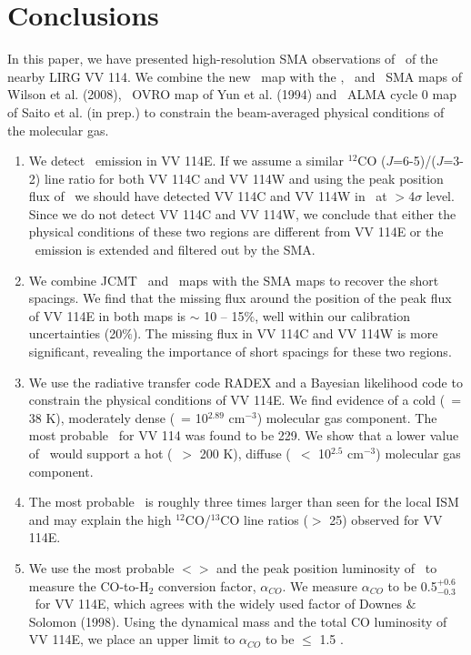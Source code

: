\section{Conclusions}%
In this paper, we have presented high-resolution SMA observations of \cosix\ of the nearby LIRG VV 114. We combine the new \cosix\ map with the \cotwo, \cothree\ and \tcotwo\ SMA maps of Wilson et al. (2008), \coone\ OVRO map of Yun et al. (1994) and \tcoone\ ALMA cycle 0 map of Saito et al. (in prep.) to constrain the beam-averaged physical conditions of the molecular gas. 
\begin{enumerate}
\item We detect \cosix\ emission in VV 114E. If we assume a similar $^{12}$CO ($J$=6-5)/($J$=3-2) line ratio for both VV 114C and VV 114W and using the peak position flux of \cothree\, we should have detected VV 114C and VV 114W in \cosix\ at $>$4$\sigma$ level. Since we do not detect VV 114C and VV 114W, we conclude that either the physical conditions of these two regions are different from VV 114E or the \cosix\ emission is extended and filtered out by the SMA. 
\item We combine JCMT \cotwo\ and \cothree\ maps with the SMA maps to recover the short spacings. We find that the missing flux around the position of the peak flux of VV 114E in both maps is $\sim$ 10 -- 15$\%$, well within our calibration uncertainties (20$\%$). The missing flux in VV 114C and VV 114W is more significant, revealing the importance of short spacings for these two regions.  
\item We use the radiative transfer code RADEX and a Bayesian likelihood code to constrain the physical conditions of VV 114E. We find evidence of a cold (\tkin\ = 38 K), moderately dense (\nhtwo\ = 10$^{2.89}$ cm$^{-3}$) molecular gas component. The most probable \xco\ for VV 114 was found to be 229. We show that a lower value of \xco\ would support a hot (\tkin\ $>$ 200 K), diffuse (\nhtwo\ $<$ 10$^{2.5}$ cm$^{-3}$) molecular gas component. 
\item The most probable \xco\ is roughly three times larger than seen for the local ISM and may explain the high $^{12}$CO/$^{13}$CO line ratios ($>$ 25) observed for VV 114E. 
\item We use the most probable $<$\nco$>$ and the peak position luminosity of \coone\ to measure the CO-to-H$_{2}$ conversion factor, $\alpha_{CO}$. We measure $\alpha_{CO}$ to be 0.5$^{+0.6}_{-0.3}$ \alphaco\ for VV 114E, which agrees with the widely used factor of Downes $\&$ Solomon (1998). Using the dynamical mass and the total CO luminosity of VV 114E, we place an upper limit to $\alpha_{CO}$ to be $\leq$ 1.5 \alphaco.
\end{enumerate}

